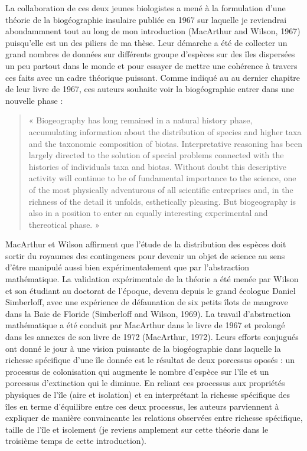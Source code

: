 La collaboration de ces deux jeunes biologistes a mené à la formulation
d'une théorie de la biogéographie insulaire publiée en 1967 sur laquelle
je reviendrai abondammnent tout au long de mon introduction (MacArthur
and Wilson, 1967) puisqu'elle est un des piliers de ma thèse. Leur
démarche a été de collecter un grand nombres de données sur différents
groupe d'espèces sur des îles dispersées un peu partout dans le monde et
pour essayer de mettre une cohérence à travers ces faits avec un cadre
théorique puissant. Comme indiqué au au dernier chapitre de leur livre
de 1967, ces auteurs souhaite voir la biogéographie entrer dans une
nouvelle phase :

\begin{quote}
« Biogeography has long remained in a natural history phase,
accumulating information about the distribution of species and higher
taxa and the taxonomic composition of biotas. Interpretative reasoning
has been largely directed to the solution of special problems connected
with the histories of individuals taxa and biotas. Without doubt this
descriptive activity will continue to be of fundamental importance to
the science, one of the most physically adventurous of all scientific
entreprises and, in the richness of the detail it unfolds, esthetically
pleasing. But biogeography is also in a position to enter an equally
interesting experimental and thereotical phase. »
\end{quote}

MacArthur et Wilson affirment que l'étude de la distribution des espèces
doit sortir du royaumes des contingences pour devenir un objet de
science au sens d'être manipulé aussi bien expérimentalement que par
l'abstraction mathématique. La validation expérimentale de la théorie a
été menée par Wilson et son étudiant au doctorat de l'époque, devenu
depuis le grand écologue Daniel Simberloff, avec une expérience de
défaunation de six petits îlots de mangrove dans la Baie de Floride
(Simberloff and Wilson, 1969). La travail d'abstraction mathématique a
été conduit par MacArthur dans le livre de 1967 et prolongé dans les
annexes de son livre de 1972 (MacArthur, 1972). Leurs efforts conjugués
ont donné le jour à une vision puissante de la biogéographie dans
laquelle la richesse spécifique d'une île donnée est le résultat de deux
porcessus oposés : un processus de colonisation qui augmente le nombre
d'espèce sur l'île et un porcessus d'extinction qui le diminue. En
reliant ces processus aux propriétés physiques de l'île (aire et
isolation) et en interprétant la richesse spécifique des îles en terme
d'équilibre entre ces deux processus, les auteurs parviennent à
expliquer de manière convaincante les relations observées entre richesse
spécifique, taille de l'île et isolement (je reviens amplement sur cette
théorie dans le troisième temps de cette introduction).

